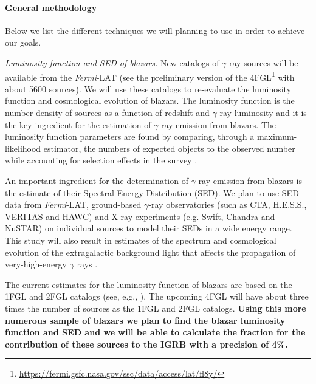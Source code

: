 \documentclass[12 pt]{article}
\newcommand{\FIXME}[1]{{\color{red}{\em Comment: }{#1}}}
\begin{document}
\vspace{-0.5cm}
\paragraph{General methodology} 
\label{sec:methodology}
Below we list the different techniques we will planning to use in order to achieve our goals.  

{\it Luminosity function and SED of blazars.}
New catalogs of $\gamma$-ray sources will be available from the {\it Fermi}-LAT (see the preliminary version of the 4FGL\footnote{\url{https://fermi.gsfc.nasa.gov/ssc/data/access/lat/fl8y/}} with about 5600 sources).
We will use these catalogs to re-evaluate the luminosity function and cosmological evolution of blazars.
The luminosity function is the number density of sources as a function of redshift and $\gamma$-ray luminosity and it is the key ingredient for the estimation of $\gamma$-ray emission from blazars.
The luminosity function parameters are found by comparing, through a maximum-likelihood estimator, the numbers of expected objects to the observed number while accounting for selection effects in the survey \cite{2012ApJ...751..108A}. 

An important ingredient for the determination of $\gamma$-ray emission from blazars is the estimate of their Spectral Energy Distribution (SED).
We plan to use SED data from {\it Fermi}-LAT, ground-based $\gamma$-ray observatories (such as CTA, H.E.S.S., VERITAS and HAWC) and X-ray experiments (e.g. Swift, Chandra and NuSTAR) on individual sources to model their SEDs in a wide energy range.
This study will also result in estimates of the spectrum and cosmological evolution of the extragalactic background light that affects the propagation of very-high-energy $\gamma$ rays \cite{2012Sci...338.1190A}.

The current estimates for the luminosity function of blazars are based on the 1FGL and 2FGL catalogs (see, e.g., \cite{2012ApJ...751..108A,Ajello:2015mfa,DiMauro:2013zfa}).
The upcoming 4FGL will have about three times the number of sources as the 1FGL and 2FGL catalogs.
{\bf Using this more numerous sample of blazars we plan to find the blazar luminosity function and SED and we will be able to calculate the fraction for the contribution of these sources to the IGRB with a precision of 4\%.}
\end{document}
